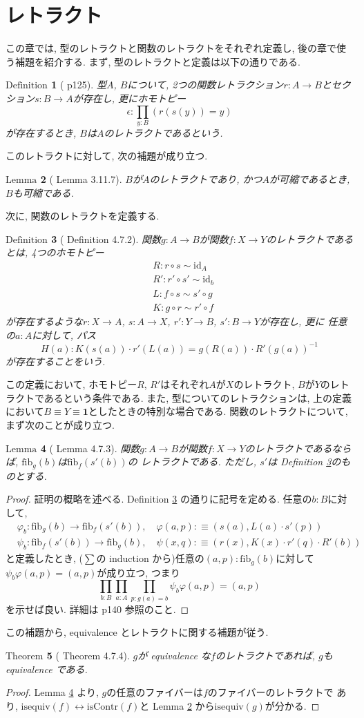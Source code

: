 \documentclass[11pt]{jsreport}
\theoremstyle{mystyle}
\newtheorem{df}{$\textrm{Definition}$}[section]
\newtheorem{lem}[df]{$\textrm{Lemma}$}
\newtheorem{thm}[df]{$\textrm{Theorem}$}
\newcommand{\bdf}{\begin{shadebox} \begin{df}}
\newcommand{\edf}{\end{df} \end{shadebox}}
\newcommand{\blem}{\begin{shadebox} \begin{lem}}
\newcommand{\elem}{\end{lem} \end{shadebox}}
\newcommand{\bthm}{\begin{shadebox} \begin{thm}}
\newcommand{\ethm}{\end{thm} \end{shadebox}}
\newcommand{\bpf}{\begin{proof}}
\newcommand{\epf}{\end{proof}}
\newcommand{\lra}{\leftrightarrow}
\newcommand{\id}{\textrm{id}}
\newcommand{\iseq}{\textrm{isequiv}}
\newcommand{\0}{\textbf{0}}
\newcommand{\fib}{\textrm{fib}}
\newcommand{\iscont}{\textrm{isContr}}
\begin{document}
\section{レトラクト} \label{sec retract}
この章では, 型のレトラクトと関数のレトラクトをそれぞれ定義し, 後の章で使う補題を紹介する. 
まず, 型のレトラクトと定義は以下の通りである. 
\bdf[\cite{hott} p125]
  型$A$, $B$について, 2つの関数レトラクション$r : A \to B$とセクション$s : B \to A$が存在し, 
  更にホモトピー
  \[
    \epsilon : \prod_{y : B} (r(s(y)) = y)
  \]
  が存在するとき, $B$は$A$のレトラクトであるという. 
\edf
このレトラクトに対して, 次の補題が成り立つ. 
\blem[\cite{hott} Lemma 3.11.7] \label{lem ret_cont}
  $B$が$A$のレトラクトであり, かつ$A$が可縮であるとき, $B$も可縮である. 
\elem
次に, 関数のレトラクトを定義する. 
\bdf[\cite{hott} Definition 4.7.2] \label{def_retract}
  関数$g : A \to B$が関数$f : X \to Y$のレトラクトであるとは, 4つのホモトピー
  \begin{align*}
    &R : r \circ s \sim \id_{A} \\
    &R' : r' \circ s' \sim \id_{b} \\
    &L : f \circ s \sim s' \circ g \\
    &K : g \circ r \sim r' \circ f
  \end{align*}
  が存在するような$r : X \to A$, $s : A \to X$, $r' : Y \to B$, $s' : B \to Y$が存在し, 更に
  任意の$a : A$に対して, パス
  \[
    H(a) : K(s(a)) \cdot r'(L(a)) = g(R(a)) \cdot R'(g(a)) ^ {-1}
  \]
  が存在することをいう. 
\edf
この定義において, ホモトピー$R$, $R'$はそれぞれ$A$が$X$のレトラクト, $B$が$Y$のレトラクトであるという条件である. 
また, 型についてのレトラクションは, 上の定義において$B \equiv Y \equiv \textbf{1}$としたときの特別な場合である. 関数のレトラクトについて, まず次のことが成り立つ. 
\blem[\cite{hott} Lemma 4.7.3] \label{lem_close_retract}
  関数$g : A \to B$が関数$f : X \to Y$のレトラクトであるならば, $\fib_g(b)$は$\fib_f(s'(b))$の
  レトラクトである. ただし, $s'$は Definition \ref{def_retract}のものとする. 
\elem
\bpf
  証明の概略を述べる. 
  Definition \ref{def_retract} の通りに記号を定める. 任意の$b : B$に対して, 
  \begin{align*}
    &\varphi_b : \fib_g (b) \to \fib_f (s'(b)), \quad
      \varphi (a, p) :\equiv (s(a), L(a) \cdot s'(p)) \\
    &\psi_b : \fib_f(s'(b)) \to \fib_g (b), \quad
      \psi (x, q) :\equiv (r(x), K(x) \cdot r'(q) \cdot R'(b))
  \end{align*}
  と定義したとき, ($\sum$の induction から)任意の$(a, p) : \fib_g (b)$に対して
  $\psi_b \varphi (a, p) = (a, p)$が成り立つ, つまり
  \[
    \prod_{b : B} \prod_{a : A} \prod_{p : g(a) = b} \psi_b \varphi (a, p) = (a, p)
  \]
  を示せば良い. 詳細は\cite{hott} p140 参照のこと. 
\epf
この補題から, equivalence とレトラクトに関する補題が従う. 
\bthm[\cite{hott} Theorem 4.7.4]
  $g$が equivalence な$f$のレトラクトであれば, $g$も equivalence である. 
\ethm
\bpf
  Lemma \ref{lem_close_retract} より, $g$の任意のファイバーは$f$のファイバーのレトラクトで
  あり, $\iseq (f) \lra \iscont (f)$と Lemma \ref{lem ret_cont} から$\iseq (g)$が分かる. 
\epf
\end{document}
